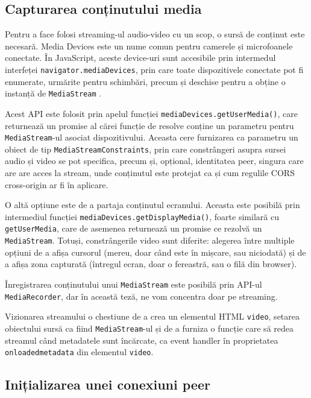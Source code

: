 \subsection{Capturarea conținutului media}
\label{sec:ch2sec4subsec1}
\indent \par Pentru a face folosi streaming-ul audio-video cu un scop, o sursă de conținut este necesară. Media Devices este un nume comun pentru camerele și microfoanele conectate. În JavaScript, aceste device-uri sunt accesibile prin intermedul interfeței \texttt{navigator.mediaDevices}, prin care toate dispozitivele conectate pot fi enumerate, urmărite pentru schimbări, precum și deschise pentru a obține o instanță de \texttt{MediaStream} \cite{WebMedia2014}.
\indent \par Acest API este folosit prin apelul funcției \texttt{mediaDevices.getUserMedia()}, care returnează un promise al cărei funcție de resolve conține un parametru pentru \texttt{MediaStream}-ul asociat dispozitivului. Aceasta cere furnizarea ca parametru un obiect de tip \texttt{MediaStreamConstraints}, prin care constrângeri asupra sursei audio și video se pot specifica, precum și, opțional, identitatea peer, singura care are are acces la stream, unde conținutul este protejat ca și cum regulile CORS cross-origin ar fi în aplicare.
\indent \par O altă opțiune este de a partaja conținutul ecranului. Aceasta este posibilă prin intermediul funcției \texttt{mediaDevices.getDisplayMedia()}, foarte similară cu \texttt{getUserMedia}, care de asemenea returnează un promise ce rezolvă un \texttt{MediaStream}. Totuși, constrângerile video sunt diferite: alegerea între multiple opțiuni de a afișa cursorul (mereu, doar când este în mișcare, sau niciodată) și de a afișa zona capturată (întregul ecran, doar o fereastră, sau o filă din browser).
\indent \par Înregistrarea conținutului unui \texttt{MediaStream} este posibilă prin API-ul \texttt{MediaRecorder}, dar în această teză, ne vom concentra doar pe streaming.
\indent \par Vizionarea streamului o chestiune de a crea un elementul HTML \texttt{video}, setarea obiectului sursă ca fiind \texttt{MediaStream}-ul și de a furniza o funcție care să redea streamul când metadatele sunt încărcate, ca event handler în proprietatea \texttt{onloadedmetadata} din elementul \texttt{video}.

\subsection{Inițializarea unei conexiuni peer}
\label{sec:ch3sec4subsec2}

